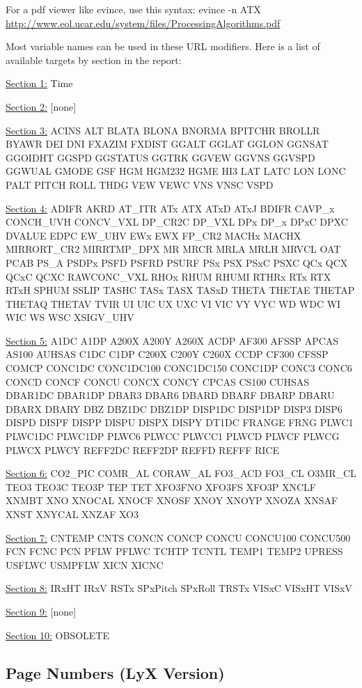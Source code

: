 \documentclass[
]{book}
\begin{document}
For a pdf viewer like evince, use this syntax:
evince -n ATX \url{http://www.eol.ucar.edu/system/files/ProcessingAlgorithms.pdf}

Most variable names can be used in these URL modifiers. Here is a list of available targets by section in the report:

\uline{Section 1:} Time

\uline{Section 2:} {{[}none{]}}

\uline{Section 3:} ACINS ALT BLATA BLONA BNORMA BPITCHR BROLLR BYAWR DEI DNI FXAZIM FXDIST GGALT GGLAT GGLON GGNSAT GGOIDHT GGSPD GGSTATUS GGTRK GGVEW GGVNS GGVSPD GGWUAL GMODE GSF HGM HGM232 HGME HI3 LAT LATC LON LONC PALT PITCH ROLL THDG VEW VEWC VNS VNSC VSPD

\uline{Section 4:} ADIFR AKRD AT\_ITR ATx ATX ATxD ATxJ BDIFR CAVP\_x CONCH\_UVH CONCV\_VXL DP\_CR2C DP\_VXL DPx DP\_x DPxC DPXC DVALUE EDPC EW\_UHV EWx EWX FP\_CR2 MACHx MACHX MIRRORT\_CR2 MIRRTMP\_DPX MR MRCR MRLA MRLH MRVCL OAT PCAB PS\_A PSDPx PSFD PSFRD PSURF PSx PSX PSxC PSXC QCx QCX QCxC QCXC RAWCONC\_VXL RHOx RHUM RHUMI RTHRx RTx RTX RTxH SPHUM SSLIP TASHC TASx TASX TASxD THETA THETAE THETAP THETAQ THETAV TVIR UI UIC UX UXC VI VIC VY VYC WD WDC WI WIC WS WSC XSIGV\_UHV

\uline{Section 5:} A1DC A1DP A200X A200Y A260X ACDP AF300 AFSSP APCAS AS100 AUHSAS C1DC C1DP C200X C200Y C260X CCDP CF300 CFSSP COMCP CONC1DC CONC1DC100 CONC1DC150 CONC1DP CONC3 CONC6 CONCD CONCF CONCU CONCX CONCY CPCAS CS100 CUHSAS DBAR1DC DBAR1DP DBAR3 DBAR6 DBARD DBARF DBARP DBARU DBARX DBARY DBZ DBZ1DC DBZ1DP DISP1DC DISP1DP DISP3 DISP6 DISPD DISPF DISPP DISPU DISPX DISPY DT1DC FRANGE FRNG PLWC1 PLWC1DC PLWC1DP PLWC6 PLWCC PLWCC1 PLWCD PLWCF PLWCG PLWCX PLWCY REFF2DC REFF2DP REFFD REFFF RICE

\uline{Section 6:} CO2\_PIC COMR\_AL CORAW\_AL FO3\_ACD FO3\_CL O3MR\_CL TEO3 TEO3C TEO3P TEP TET XFO3FNO XFO3FS XFO3P XNCLF XNMBT XNO XNOCAL XNOCF XNOSF XNOY XNOYP XNOZA XNSAF XNST XNYCAL XNZAF XO3

\uline{Section 7:} CNTEMP CNTS CONCN CONCP CONCU CONCU100 CONCU500 FCN FCNC PCN PFLW PFLWC TCHTP TCNTL TEMP1 TEMP2 UPRESS USFLWC USMPFLW XICN XICNC

\uline{Section 8:} IRxHT IRxV RSTx SPxPitch SPxRoll TRSTx VISxC VISxHT VISxV

\uline{Section 9:} {{[}none{]}}

\uline{Section 10:} OBSOLETE

\hypertarget{page-numbers-lyx-version}{%
\subsection*{Page Numbers (LyX Version)}\label{page-numbers-lyx-version}}
\end{document}
